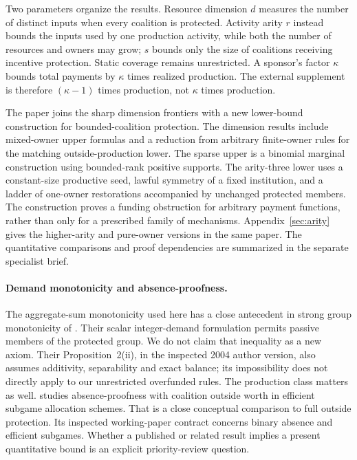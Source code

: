 \documentclass[11pt]{article}
\theoremstyle{definition}\newtheorem{definition}[theorem]{Definition}
\theoremstyle{remark}\newtheorem{remark}[theorem]{Remark}
\begin{document}
Two parameters organize the results. Resource dimension $d$ measures the
number of distinct inputs when every coalition is protected. Activity arity
$r$ instead bounds the inputs used by one production activity, while both the
number of resources and owners may grow; $s$ bounds only the size of coalitions
receiving incentive protection. Static coverage remains unrestricted.
A sponsor's factor $\kappa$ bounds total payments by $\kappa$ times realized
production. The external supplement is therefore $(\kappa-1)$ times
production, not $\kappa$ times production.

The paper joins the sharp dimension frontiers with a new lower-bound
construction for bounded-coalition protection. The dimension results include
mixed-owner upper formulas and a reduction from arbitrary finite-owner rules
for the matching outside-production lower. The sparse upper is a binomial
marginal construction using bounded-rank positive supports. The arity-three
lower uses a constant-size productive seed, lawful symmetry of a fixed
institution, and a ladder of one-owner restorations accompanied by unchanged
protected members. The construction proves a funding obstruction for arbitrary
payment functions, rather than only for a prescribed family of mechanisms.
Appendix~\ref{sec:arity} gives the higher-arity and pure-owner versions in the
same paper. The quantitative comparisons and proof dependencies are summarized
in the separate specialist brief.

\paragraph{Demand monotonicity and absence-proofness.}
The aggregate-sum monotonicity used here has a close antecedent in strong group
monotonicity of \citet{MoulinSprumont2004}. Their scalar integer-demand
formulation permits passive members of the protected group. We do not claim
that inequality as a new axiom. Their Proposition~2(ii), in the inspected 2004
author version, also assumes additivity, separability and exact balance; its
impossibility does not directly apply to our unrestricted overfunded rules.
The production class matters as well. \citet{Dogan2013} studies
absence-proofness with coalition outside worth in efficient subgame allocation
schemes. That is a close conceptual comparison to full outside protection.
Its inspected working-paper contract concerns binary absence and efficient
subgames. Whether a published or related result implies a present quantitative
bound is an explicit priority-review question.
\end{document}
